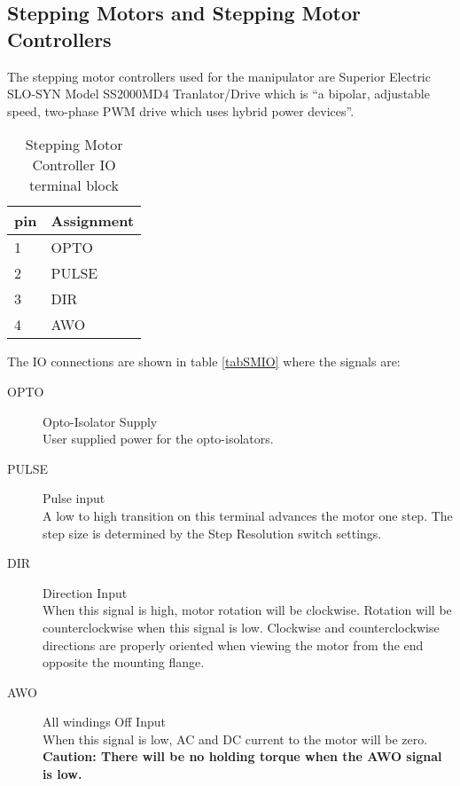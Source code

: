 \clearpage
 
\newpage
\subsection{Stepping Motors and Stepping Motor Controllers}
The stepping motor controllers used for the manipulator are Superior Electric
SLO-SYN Model SS2000MD4 Tranlator/Drive which is ``a bipolar, adjustable
speed, two-phase PWM drive which uses hybrid power devices''.
\begin{table}[htb]
\begin{center}
\begin{tabular}{l|l} 
pin & Assignment \\ \hline
1  &  OPTO \\
2  & PULSE \\
3  & DIR \\
4  & AWO \\
\end{tabular}
\caption[Stepping Motor Controller IO terminal block]
        {Stepping Motor Controller IO terminal block
        }
\end{center}
\end{table}  
The IO connections are shown in table \ref{tabSMIO}
where the signals are:
\begin{description}
\item[OPTO] Opto-Isolator Supply\\
    User supplied power for the opto-isolators.
\item[PULSE] Pulse input\\
    A low to high transition on this terminal advances the motor one
    step.  The step size is determined by the Step Resolution switch
    settings.
\item[DIR] Direction Input\\
    When this signal is high, motor rotation will be clockwise.  Rotation
    will be counterclockwise when this signal is low.
    Clockwise and counterclockwise directions are properly oriented
    when viewing the motor from the end opposite the mounting flange.
\item[AWO] All windings Off Input\\
  When this signal is low, AC and DC current to the motor will be
  zero.  {\bf Caution:  There will be no holding torque when the AWO signal
  is low.}
\end{description}
